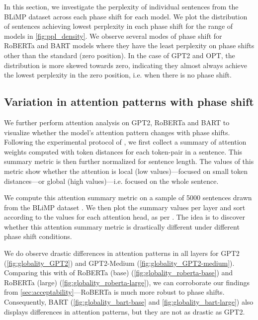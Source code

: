 \documentclass[letterpaper, 12pt]{report}
\begin{document}
In this section, we investigate the perplexity of individual sentences from the BLiMP dataset across each phase shift for each model. We plot the distribution of sentences achieving lowest perplexity in each phase shift for the range of models in \autoref{fig:ppl_density}. We observe several modes of phase shift for RoBERTa and BART models where they have the least perplexity on phase shifts other than the standard (zero position). In the case of GPT2 and OPT, the distribution is more skewed towards zero, indicating they almost always achieve the lowest perplexity in the zero position, i.e. when there is no phase shift.

\subsection{Variation in attention patterns with phase shift}
\label{sec:pos_attention_analysis}


We further perform attention analysis on GPT2, RoBERTa and BART to visualize whether the model's attention pattern changes with phase shifts. Following the experimental protocol of \citet{raghu2021vision}, we first collect a summary of attention weights computed with token distances for each token-pair in a sentence. This summary metric is then further normalized for sentence length. The values of this metric show whether the attention is local (low values)---focused on small token distances---or global (high values)---i.e. focused on the whole sentence.

We compute this attention summary metric on a sample of 5000 sentences drawn from the BLiMP dataset \cite{warstadt-etal-2020-BLiMP-benchmark}. We then plot the summary values per layer and sort according to the values for each attention head, as per \citet{raghu2021vision}. The idea is to discover whether this attention summary metric is drastically different under different phase shift conditions. %

We do observe drastic differences in attention patterns in all layers for GPT2 (\autoref{fig:globality_GPT2}) and GPT2-Medium (\autoref{fig:globality_GPT2-medium}). Comparing this with of RoBERTa (base) (\autoref{fig:globality_roberta-base}) and RoBERTa (large) (\autoref{fig:globality_roberta-large}), we can corroborate our findings from \autoref{sec:acceptability}---RoBERTa is much more robust to phase shifts. Consequently, BART (\autoref{fig:globality_bart-base} and \autoref{fig:globality_bart-large}) also displays differences in attention patterns, but they are not as drastic as GPT2.
\end{document}
